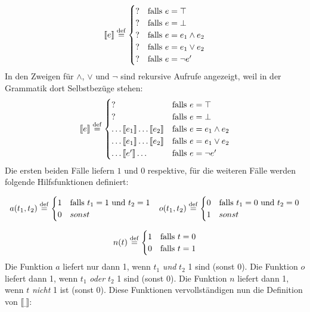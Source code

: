 \begin{displaymath}
  \llbracket e \rrbracket \stackrel{\rm def}{=}
  \begin{cases}
    ? & \textrm{falls } e = \top\\
    ? & \textrm{falls } e = \bot\\
    ? & 
    \textrm{falls } e =
    e_1\wedge e_2\\
    ? & 
    \textrm{falls } e =
    e_1\vee e_2\\
    ? & \textrm{falls } e = \neg e'
  \end{cases}
\end{displaymath}
%
In den Zweigen für $\wedge$, $\vee$ und $\neg$ sind rekursive Aufrufe
angezeigt, weil in der Grammatik dort Selbstbezüge stehen:
%
\begin{displaymath}
  \llbracket e \rrbracket \stackrel{\rm def}{=}
  \begin{cases}
    ? & \textrm{falls } e = \top\\
    ? & \textrm{falls } e = \bot\\
    \ldots \llbracket e_1\rrbracket\ldots\llbracket e_2\rrbracket  & 
    \textrm{falls } e =
    e_1\wedge e_2\\
    \ldots \llbracket e_1\rrbracket\ldots\llbracket e_2\rrbracket & 
    \textrm{falls } e =
    e_1\vee e_2\\
    \ldots \llbracket e'\rrbracket\ldots  & \textrm{falls } e = \neg e'
  \end{cases}
\end{displaymath}
%
Die ersten beiden Fälle liefern $1$ und $0$ respektive, für die
weiteren Fälle werden folgende Hilfsfunktionen definiert:

\begin{displaymath}
  \begin{array}{cc}
  a(t_1, t_2) \stackrel{\rm def}{=} 
  \begin{cases}
    1 & \textrm{falls } t_1 = 1 \textrm{ und } t_2 = 1\\
    0 & sonst
  \end{cases}
  &
  o(t_1, t_2) \stackrel{\rm def}{=} 
  \begin{cases}
    0 & \textrm{falls } t_1 = 0 \textrm{ und } t_2 = 0\\
    1 & sonst
  \end{cases}
\end{array}
\end{displaymath}

\begin{displaymath}
  n(t) \stackrel{\rm def}{=} 
  \begin{cases}
    1 & \textrm{falls } t = 0\\
    0 & \textrm{falls } t = 1
  \end{cases}
\end{displaymath}
%
Die Funktion $a$ liefert nur dann 1, wenn $t_1$ \emph{und} $t_2$ 1
sind (sonst $0$).  Die Funktion $o$ liefert dann 1, wenn $t_1$
\emph{oder} $t_2$ 1 sind (sonst $0$).  Die Funktion $n$ liefert dann
1, wenn $t$ \emph{nicht} 1 ist (sonst $0$).  Diese Funktionen
vervollständigen nun die Definition von $\llbracket \underline{~}
\rrbracket$:

